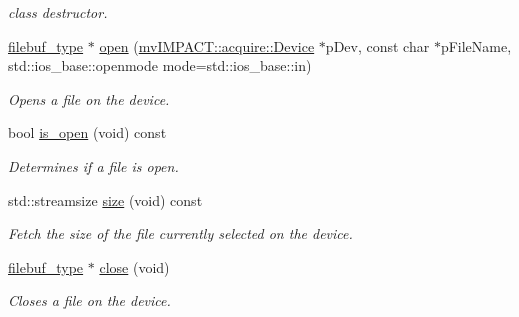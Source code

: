 \begin{DoxyCompactItemize}
\begin{DoxyCompactList}\small\item\em class destructor. \end{DoxyCompactList}\item 
\hyperlink{classmv_i_m_p_a_c_t_1_1acquire_1_1_gen_i_cam_1_1_i_dev_file_stream_buf}{filebuf\+\_\+type} $\ast$ \hyperlink{classmv_i_m_p_a_c_t_1_1acquire_1_1_gen_i_cam_1_1_i_dev_file_stream_buf_abeac383d8920db202b6b9aa6d5ec557e}{open} (\hyperlink{classmv_i_m_p_a_c_t_1_1acquire_1_1_device}{mv\+I\+M\+P\+A\+C\+T\+::acquire\+::\+Device} $\ast$p\+Dev, const char $\ast$p\+File\+Name, std\+::ios\+\_\+base\+::openmode mode=std\+::ios\+\_\+base\+::in)
\begin{DoxyCompactList}\small\item\em Opens a file on the device. \end{DoxyCompactList}\item 
bool \hyperlink{classmv_i_m_p_a_c_t_1_1acquire_1_1_gen_i_cam_1_1_i_dev_file_stream_buf_a1582174c671638bd6faedac8e60890e6}{is\+\_\+open} (void) const 
\begin{DoxyCompactList}\small\item\em Determines if a file is open. \end{DoxyCompactList}\item 
std\+::streamsize \hyperlink{classmv_i_m_p_a_c_t_1_1acquire_1_1_gen_i_cam_1_1_i_dev_file_stream_buf_a5994f4d449d11de4188201f74ffafd94}{size} (void) const 
\begin{DoxyCompactList}\small\item\em Fetch the size of the file currently selected on the device. \end{DoxyCompactList}\item 
\hyperlink{classmv_i_m_p_a_c_t_1_1acquire_1_1_gen_i_cam_1_1_i_dev_file_stream_buf}{filebuf\+\_\+type} $\ast$ \hyperlink{classmv_i_m_p_a_c_t_1_1acquire_1_1_gen_i_cam_1_1_i_dev_file_stream_buf_a0bdb237270baa68431793dcf5de9c30f}{close} (void)
\begin{DoxyCompactList}\small\item\em Closes a file on the device. \end{DoxyCompactList}\end{DoxyCompactItemize}
